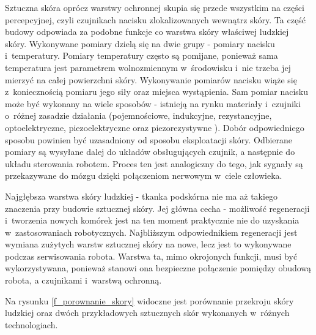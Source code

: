 Sztuczna skóra oprócz warstwy ochronnej skupia się przede wszystkim na części percepcyjnej, czyli czujnikach nacisku zlokalizowanych wewnątrz skóry. Ta część budowy odpowiada za podobne funkcje co warstwa skóry właściwej ludzkiej skóry.
Wykonywane pomiary dzielą się na dwie grupy - pomiary nacisku i~temperatury. Pomiary temperatury często są pomijane, ponieważ sama temperatura jest parametrem wolnozmiennym w~środowisku i~nie trzeba jej mierzyć na całej powierzchni skóry. Wykonywanie pomiarów nacisku wiąże się z~koniecznością pomiaru jego siły oraz miejsca wystąpienia. Sam pomiar nacisku może być wykonany na wiele sposobów - istnieją na rynku materiały i~czujniki o~różnej zasadzie działania (pojemnościowe, indukcyjne, rezystancyjne, optoelektryczne, piezoelektryczne oraz piezorezystywne \cite{b_article_reviev_tactile_skin}). Dobór odpowiedniego sposobu powinien być uzasadniony od sposobu eksploatacji skóry.
Odbierane pomiary są wysyłane dalej do układów obsługujących czujnik, a następnie do układu sterowania robotem. Proces ten jest analogiczny do tego, jak sygnały są przekazywane do mózgu dzięki połączeniom nerwowym w~ciele człowieka.

Najgłębsza warstwa skóry ludzkiej - tkanka podskórna nie ma aż takiego znaczenia przy budowie sztucznej skóry. Jej główna cecha - możliwość regeneracji i~tworzenia nowych komórek jest na ten moment praktycznie nie do uzyskania w~zastosowaniach robotycznych. Najbliższym odpowiednikiem regeneracji jest wymiana zużytych warstw sztucznej skóry na nowe, lecz jest to wykonywane podczas serwisowania robota. Warstwa ta, mimo okrojonych funkcji, musi być wykorzystywana, ponieważ stanowi ona bezpieczne połączenie pomiędzy obudową robota, a czujnikami i~warstwą ochronną.

Na rysunku \ref{f_porownanie_skory} widoczne jest porównanie przekroju skóry ludzkiej oraz dwóch przykładowych sztucznych skór wykonanych w~różnych technologiach.

